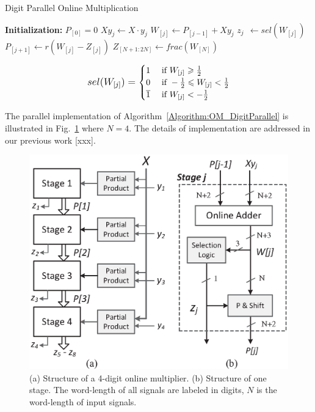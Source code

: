 \documentclass[10pt, conference, compsocconf]{IEEEtran}
\begin{document}
\begin{algorithm}[tbp]
  \caption{Digit Parallel Online Multiplication}\label{Algorithm:OM_DigitParallel}
  \begin{algorithmic}[1]
    \State \textbf{Initialization:} $P_{[0]}=0$                     \vspace{.5ex}
                                           \vspace{.5ex}
        \State $Xy_j \leftarrow X \cdot y_j$                        \vspace{.5ex}
        \State $W_{[j]}    \leftarrow  P_{[j-1]} + Xy_j$            \vspace{.5ex}
        \State $z_{j}  ~~      \leftarrow  sel(W_{[j]})$            \vspace{.5ex}
        \State $P_{[j+1]}  \leftarrow  r\left(W_{[j]}-Z_{[j]}\right)$   \vspace{.5ex}
    \EndFor                                                         \vspace{.5ex}
    \State $Z_{[N+1:2N]} \leftarrow frac(W_{[N]})$                  \vspace{.5ex}
  \end{algorithmic}
  \vspace{-1ex}
\end{algorithm}

\begin{eqnarray}\label{Eq:SelFunc_OM}
\small
  sel(W_{[j]})=\begin{cases}
    1 & \text{ if } W_{[j]} \geqslant \frac{1}{2} \\
    0 & \text{ if } -\frac{1}{2}\leqslant W_{[j]}<\frac{1}{2} \\
    \overline{1} & \text{ if } W_{[j]}<-\frac{1}{2}
  \end{cases}
\normalsize
\end{eqnarray}

The parallel implementation of Algorithm~\ref{Algorithm:OM_DigitParallel} is illustrated in Fig.~\ref{Fig:PM} where $N=4$. The details of implementation are addressed in our previous work [xxx].

\begin{figure}[tbp]
  \centering
  \includegraphics[width=.42\textwidth]{./figures/ParallelMult_Structure.eps}
  \caption{(a) Structure of a 4-digit online multiplier. (b) Structure of one stage. The word-length of all signals are labeled in digits, $N$ is the word-length of input signals.}
    \vspace{-2ex}
  \label{Fig:PM}
\end{figure}
\end{document}
